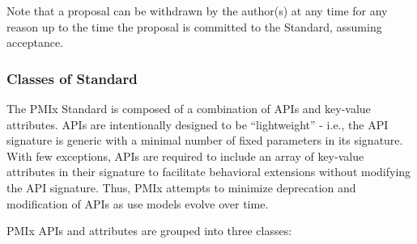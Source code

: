 \documentclass{article}
\begin{document}
Note that a proposal can be withdrawn by the author(s) at any time for
any reason up to the time the proposal is committed to the Standard,
assuming acceptance.

\hypertarget{classes-of-standard}{%
\subsubsection{Classes of Standard}%
\label{classes-of-standard}}

The PMIx Standard is composed of a combination of APIs and key-value
attributes. APIs are intentionally designed to be ``lightweight'' -
i.e., the API signature is generic with a minimal number of fixed
parameters in its signature. With few exceptions, APIs are required to
include an array of key-value attributes in their signature to
facilitate behavioral extensions without modifying the API signature.
Thus, PMIx attempts to minimize deprecation and modification of APIs as
use models evolve over time.

PMIx APIs and attributes are grouped into three classes:
\end{document}
